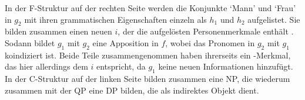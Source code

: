 In der F-Struktur auf der rechten Seite werden die
Konjunkte  `Mann' und  `Frau' in $g_2$ mit ihren
grammatischen Eigenschaften einzeln als $h_1$ und $h_2$ aufgelistet. Sie bilden
zusammen einen neuen  $i$, der die aufgelösten
Personenmerkmale enthält%
. Sodann bildet $g_1$ mit $g_2$ eine Apposition in $f$, wobei
das Pronomen  in $g_2$ mit $g_1$ koindiziert
ist. Beide Teile zusammengenommen haben ihrerseits ein -Merkmal, das
hier allerdings dem  $i$ entspricht, da $g_1$ keine neuen
Informationen hinzufügt. In der C-Struktur auf der
linken Seite bilden  zusammen eine NP, die
wiederum zusammen mit der QP  eine
DP bilden, die als indirektes Objekt dient.

